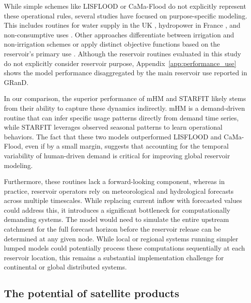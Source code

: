 \documentclass[hess, manuscript]{copernicus}
\begin{document}
While simple schemes like LISFLOOD or CaMa-Flood do not explicitly represent these operational rules, several studies have focused on purpose-specific modeling. This includes routines for water supply in the UK \citep{Salwey2024}, hydropower in France \citep{Baratgin2024}, and non-consumptive uses \citep{Shrestha2024}. Other approaches differentiate between irrigation and non-irrigation schemes \citep{Hanasaki2006, Sadki2023} or apply distinct objective functions based on the reservoir's primary use \citep{Haddeland2006}. Although the reservoir routines evaluated in this study do not explicitly consider reservoir purpose, Appendix~\ref{app:performance_use} shows the model performance disaggregated by the main reservoir use reported in GRanD.

In our comparison, the superior performance of mHM and STARFIT likely stems from their ability to capture these dynamics indirectly. mHM is a demand-driven routine that can infer specific usage patterns directly from demand time series, while STARFIT leverages observed seasonal patterns to learn operational behaviors. The fact that these two models outperformed LISFLOOD and CaMa-Flood, even if by a small margin, suggests that accounting for the temporal variability of human-driven demand is critical for improving global reservoir modeling.

Furthermore, these routines lack a forward-looking component, whereas in practice, reservoir operators rely on meteorological and hydrological forecasts across multiple timescales. While replacing current inflow with forecasted values could address this, it introduces a significant bottleneck for computationally demanding systems. The model would need to simulate the entire upstream catchment for the full forecast horizon before the reservoir release can be determined at any given node. While local or regional systems running simpler lumped models could potentially process these computations sequentially at each reservoir location, this remains a substantial implementation challenge for continental or global distributed systems.

\subsection{The potential of satellite products}
\label{sec:satellite_products}
\end{document}
